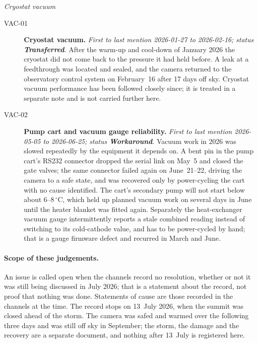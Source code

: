 \noindent\textit{Cryostat vacuum}
\begin{description}
\item[VAC-01]\label{iss:VAC-01} \textbf{Cryostat vacuum.}
  \emph{First to last mention 2026-01-27 to 2026-02-16; status \textcolor{sttra}{\textbf{Transferred}}.}
  After the warm-up and cool-down of January 2026 the cryostat did not come back to the pressure it had held before.  A leak at a feedthrough was located and sealed, and the camera returned to the observatory control system on February~16 after 17 days off sky.  Cryostat vacuum performance has been followed closely since; it is treated in a separate note and is not carried further here.

\item[VAC-02]\label{iss:VAC-02} \textbf{Pump cart and vacuum gauge reliability.}
  \emph{First to last mention 2026-05-05 to 2026-06-25; status \textcolor{stwrk}{\textbf{Workaround}}.}
  Vacuum work in 2026 was slowed repeatedly by the equipment it depends on.  A bent pin in the pump cart's RS232 connector dropped the serial link on May~5 and closed the gate valves; the same connector failed again on June~21--22, driving the camera to a safe state, and was recovered only by power-cycling the cart with no cause identified.  The cart's secondary pump will not start below about 6--8\,$^{\circ}$C, which held up planned vacuum work on several days in June until the heater blanket was fitted again.  Separately the heat-exchanger vacuum gauge intermittently reports a stale combined reading instead of switching to its cold-cathode value, and has to be power-cycled by hand; that is a gauge firmware defect and recurred in March and June.

\end{description}

\paragraph{Scope of these judgements.}
An issue is called open when the channels record no resolution, whether or not
it was still being discussed in July 2026; that is a statement about the record,
not proof that nothing was done.  Statements of cause are those recorded in the
channels at the time.  The record stops on 13~July 2026, when the summit was
closed ahead of the storm.  The camera was safed and warmed over the following
three days and was still off sky in September; the storm, the damage and the
recovery are a separate document, and nothing after 13~July is registered here.

